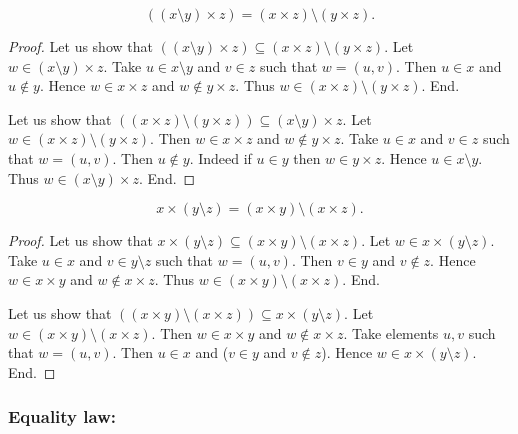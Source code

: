 \documentclass[../../set-theory.ftl.tex]{subfiles}
\begin{document}
  \begin{forthel}
    \begin{proposition}\label{SetTheory_01_06_517847}
      \[ ((x \setminus y) \times z) = (x \times z) \setminus (y \times z). \]
    \end{proposition}
    \begin{proof}
      Let us show that $((x \setminus y) \times z) \subseteq (x \times z) \setminus (y \times z).$
        Let $w \in (x \setminus y) \times z$.
        Take $u \in x \setminus y$ and $v \in z$ such that $w = (u,v)$.
        Then $u \in x$ and $u \notin y$.
        Hence $w \in x \times z$ and $w \notin y \times z$.
        Thus $w \in (x \times z) \setminus (y \times z)$.
      End.

      Let us show that $((x \times z) \setminus (y \times z)) \subseteq (x \setminus y) \times z$.
        Let $w \in (x \times z) \setminus (y \times z)$.
        Then $w \in x \times z$ and $w \notin y \times z$.
        Take $u \in x$ and $v \in z$ such that $w = (u,v)$.
        Then $u \notin y$.
        Indeed if $u \in y$ then $w \in y \times z$.
        Hence $u \in x \setminus y$.
        Thus $w \in (x \setminus y) \times z$.
      End.
    \end{proof}

    \begin{proposition}\label{SetTheory_01_06_773842}
      \[ x \times (y \setminus z) = (x \times y) \setminus (x \times z). \]
    \end{proposition}
    \begin{proof}
      Let us show that $x \times (y \setminus z) \subseteq (x \times y) \setminus (x \times z)$.
        Let $w \in x \times (y \setminus z)$.
        Take $u \in x$ and $v \in y \setminus z$ such that $w = (u,v)$.
        Then $v \in y$ and $v \notin z$.
        Hence $w \in x \times y$ and $w \notin x \times z$.
        Thus $w \in (x \times y) \setminus (x \times z)$.
      End.

      Let us show that $((x \times y) \setminus (x \times z)) \subseteq x \times (y \setminus z)$.
        Let $w \in (x \times y) \setminus (x \times z)$.
        Then $w \in x \times y$ and $w \notin x \times z$.
        Take elements $u,v$ such that $w = (u,v)$.
        Then $u \in x$ and ($v \in y$ and $v \notin z$).
        Hence $w \in x \times (y \setminus z)$.
      End.
    \end{proof}
  \end{forthel}


  \subsubsection*{Equality law:}
\end{document}
